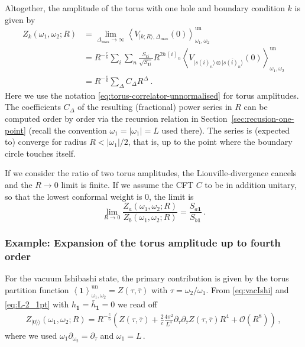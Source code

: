 \documentclass[11pt,a4paper]{article}
\numberwithin{equation}{section}
\def\ket#1{|{#1}\rangle}
\newcommand{\one}{\mathbf{1}} %
\begin{document}
\noindent
Altogether, the amplitude of the torus with one hole and boundary condition $k$ is given by
\begin{align}
Z_k( \omega_1,\omega_2;R ) &= \lim_{\Delta_\mathrm{max} \to \infty} \left\langle V_{\ket{k;R},\Delta_\mathrm{max}}(0)\right\rangle_{\omega_1,\omega_2}^\mathrm{un}\nonumber \\
&=  R^{-\frac{c}{6}}\sum_i \sum_{n} \frac{S_{ki}}{\sqrt{S_{\one i}}} R^{2 h(i)_{n}  } \left\langle V_{ \ket{s(i)_{n}} \otimes \overline{\ket{s(i)_{n}}}}(0)\right\rangle_{\omega_1,\omega_2}^\mathrm{un}
\nonumber \\
&=  R^{-\frac{c}{6}}\sum_{\Delta} C_\Delta R^\Delta  
~.
\label{eq:Zopen1}
\end{align}
Here we use the notation \eqref{eq:torus-correlator-unnormalised} for torus amplitudes. The coefficients $C_\Delta$ of the resulting (fractional) power series in $R$ can be computed order by order via the recursion relation in Section~\ref{sec:recusion-one-point} (recall the convention $\omega_1 = |\omega_1|=L$ used there).
The series is (expected to) converge for radius $R < |\omega_1|/2$, that is, up to the point where the boundary circle touches itself.

If we consider the ratio of two torus amplitudes, the Liouville-divergence cancels and the $R\to 0$ limit is finite. If we assume the CFT $C$ to be in addition unitary, so that the lowest conformal weight is $0$, the limit is
%
\begin{equation}\label{eq:leading-beh-closed}
\lim_{R\to0}\frac{Z_a(\omega_1,\omega_2;R)}{ Z_b(\omega_1,\omega_2;R)} = \frac{S_{a \one}}{S_{b \one}}\,.
\end{equation}


\subsubsection*{Example: Expansion of the torus amplitude up to fourth order}

For the vacuum Ishibashi state, the primary contribution is given by the torus partition function $\left\langle\one\right\rangle^{\mathrm{un}}_{\omega_1,\omega_2} = Z(\tau,\bar{\tau})$ with $\tau = \omega_2/\omega_1$. From \eqref{eq:vacIshi} and \eqref{eq:L-2_1pt} with $h_\one =\bar{h}_\one =0$ we read off
%
\begin{align}
    Z_{\ket{0}\!\rangle}(\omega_1,\omega_2;R) = R^{-\frac{c}{6}} \left( Z(\tau,\bar{\tau}) + \frac{2}{c} \frac{4\pi^2}{L^4} \partial_\tau\partial_{\bar{\tau}}Z(\tau,\bar{\tau}) R^{4}+ \mathcal{O}(R^8)\right)\,, \label{eq:ZIshi0}
\end{align}
%
where we used $\omega_1\partial_{\omega_2} = \partial_\tau$ and $\omega_1 = L$\,.
\end{document}
